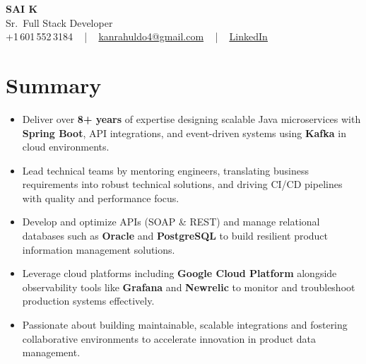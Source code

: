 \documentclass[letterpaper,11pt]{article}
\newcommand{\resumeItem}[1]{
  \item\footnotesize{
    {#1 \vspace{-2pt}}
  }
}
\newcommand{\resumeItemListStart}{\begin{itemize}[leftmargin=*]}
\newcommand{\resumeItemListEnd}{\end{itemize}\vspace{-5pt}}
\begin{document}
\begin{center}
    {\fontsize{14pt}{12pt}\selectfont \textbf{\MakeUppercase{Sai K}}}\\ \vspace{2pt}
    \fontsize{10pt}{12pt}\selectfont Sr.\ Full Stack Developer\\ \vspace{2pt}
    \fontsize{10pt}{12pt}\selectfont +1\,601\,552\,3184 ~ | ~
    \href{mailto:kanrahuldo4@gmail.com}{kanrahuldo4@gmail.com} ~ | ~
    \href{https://www.linkedin.com/in/srrrk/}{\color{blue}\underline{LinkedIn}}
    \vspace{-10pt}
\end{center}

\section{Summary}
\fontsize{9pt}{10pt}\selectfont
\resumeItemListStart
  \resumeItem{Deliver over \textbf{8+ years} of expertise designing scalable Java microservices with \textbf{Spring Boot}, API integrations, and event-driven systems using \textbf{Kafka} in cloud environments.}
  \resumeItem{Lead technical teams by mentoring engineers, translating business requirements into robust technical solutions, and driving CI/CD pipelines with quality and performance focus.}
  \resumeItem{Develop and optimize APIs (SOAP \& REST) and manage relational databases such as \textbf{Oracle} and \textbf{PostgreSQL} to build resilient product information management solutions.}
  \resumeItem{Leverage cloud platforms including \textbf{Google Cloud Platform} alongside observability tools like \textbf{Grafana} and \textbf{Newrelic} to monitor and troubleshoot production systems effectively.}
  \resumeItem{Passionate about building maintainable, scalable integrations and fostering collaborative environments to accelerate innovation in product data management.}
\resumeItemListEnd
\vspace{-6pt}

\end{document}
